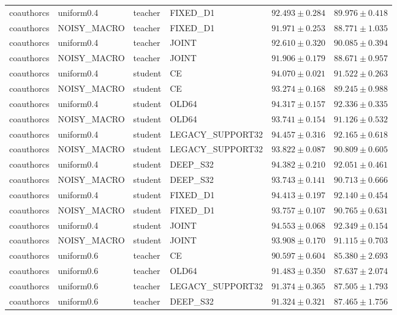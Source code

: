 \begin{longtable}{llllrr}
coauthorcs & uniform0.4 & teacher & FIXED\_D1 & $92.493 \pm 0.284$ & $89.976 \pm 0.418$ \\
coauthorcs & NOISY\_MACRO & teacher & FIXED\_D1 & $91.971 \pm 0.253$ & $88.771 \pm 1.035$ \\
coauthorcs & uniform0.4 & teacher & JOINT & $92.610 \pm 0.320$ & $90.085 \pm 0.394$ \\
coauthorcs & NOISY\_MACRO & teacher & JOINT & $91.906 \pm 0.179$ & $88.671 \pm 0.957$ \\
coauthorcs & uniform0.4 & student & CE & $94.070 \pm 0.021$ & $91.522 \pm 0.263$ \\
coauthorcs & NOISY\_MACRO & student & CE & $93.274 \pm 0.168$ & $89.245 \pm 0.988$ \\
coauthorcs & uniform0.4 & student & OLD64 & $94.317 \pm 0.157$ & $92.336 \pm 0.335$ \\
coauthorcs & NOISY\_MACRO & student & OLD64 & $93.741 \pm 0.154$ & $91.126 \pm 0.532$ \\
coauthorcs & uniform0.4 & student & LEGACY\_SUPPORT32 & $94.457 \pm 0.316$ & $92.165 \pm 0.618$ \\
coauthorcs & NOISY\_MACRO & student & LEGACY\_SUPPORT32 & $93.822 \pm 0.087$ & $90.809 \pm 0.605$ \\
coauthorcs & uniform0.4 & student & DEEP\_S32 & $94.382 \pm 0.210$ & $92.051 \pm 0.461$ \\
coauthorcs & NOISY\_MACRO & student & DEEP\_S32 & $93.743 \pm 0.141$ & $90.713 \pm 0.666$ \\
coauthorcs & uniform0.4 & student & FIXED\_D1 & $94.413 \pm 0.197$ & $92.140 \pm 0.454$ \\
coauthorcs & NOISY\_MACRO & student & FIXED\_D1 & $93.757 \pm 0.107$ & $90.765 \pm 0.631$ \\
coauthorcs & uniform0.4 & student & JOINT & $94.553 \pm 0.068$ & $92.349 \pm 0.154$ \\
coauthorcs & NOISY\_MACRO & student & JOINT & $93.908 \pm 0.170$ & $91.115 \pm 0.703$ \\
coauthorcs & uniform0.6 & teacher & CE & $90.597 \pm 0.604$ & $85.380 \pm 2.693$ \\
coauthorcs & uniform0.6 & teacher & OLD64 & $91.483 \pm 0.350$ & $87.637 \pm 2.074$ \\
coauthorcs & uniform0.6 & teacher & LEGACY\_SUPPORT32 & $91.374 \pm 0.365$ & $87.505 \pm 1.793$ \\
coauthorcs & uniform0.6 & teacher & DEEP\_S32 & $91.324 \pm 0.321$ & $87.465 \pm 1.756$ \\

\end{longtable}

